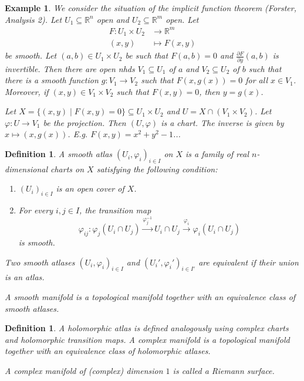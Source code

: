\documentclass[12pt]{article}
\theoremstyle{darkgreentheorem}
\theoremstyle{darkbluedefinition}
\newtheorem{defn}[thm]{Definition}
\theoremstyle{darkredexample}
\newtheorem{exa}[thm]{Example}
\theoremstyle{remark}
\newcommand{\R}{\mathbb{R}}
\newcommand{\1}{\mathbbm{1}}
\newcommand{\tms}{\times}
\begin{document}
\begin{exa}
    We consider the situation of the implicit function theorem (Forster, Analysis 2).
    Let $U_{1}\subseteq \R^{n}$ open and $U_{2}\subseteq \R^{m}$ open.
    Let
    \begin{align*}
	F\colon U_{1}\times U_{2} &\to \R^{m} \\
	(x,y) &\mapsto F(x,y)
    \end{align*}
    be smooth.
    Let $(a,b)\in U_{1}\times U_{2}$ be such that $F(a,b)=0$ and $\frac{\partial F}{\partial y}(a,b)$ is invertible.
    Then there are open nhds $V_{1}\subseteq U_{1}$ of $a$ and $V_{2}\subseteq U_{2}$ of $b$ such that there is a smooth function $g\colon V_{1}\to V_{2}$ such that $F(x,g(x))=0$ for all $x\in V_{1}$.
    Moreover, if $(x,y)\in V_{1}\times V_{2}$ such that $F(x,y)=0$, then $y=g(x)$.

    Let $X=\{(x,y)\mid F(x,y)=0\} \subseteq U_{1}\times U_{2}$ and $U=X\cap (V_{1}\tms V_{2})$.
    Let $\varphi \colon U\to V_{1}$ be the projection.
    Then $(U,\varphi)$ is a chart.
    The inverse is given by $x\mapsto (x,g(x))$.
    E.g. $F(x,y)=x^{2}+y^{2}-1$...
\end{exa}

\begin{defn}
    A \textit{smooth atlas} $(U_{i},\varphi_{i})_{i\in I}$ on $X$ is a family of real $n$-dimensional charts on $X$ satisfying the following condition:
    \begin{enumerate}[label=\arabic*)]
	\item $(U_{i})_{i\in I}$ is an open cover of $X$.
	\item For every $i,j\in I$, the transition map
	    \[\varphi_{ij}\colon \varphi_{j}(U_{i}\cap U_{j})\xrightarrow{\varphi_{j}^{-1}} U_{i}\cap U_{j}\xrightarrow{\varphi_{i}} \varphi_{i}(U_{i}\cap U_{j}) \]
	    is smooth.
    \end{enumerate}
    Two smooth atlases $(U_{i},\varphi_{i})_{i\in I}$ and $(U_{i}',\varphi_{i}')_{i\in I'}$ are equivalent if their union is an atlas.

    A \textit{smooth manifold} is a topological manifold together with an equivalence class of smooth atlases.
\end{defn}

\begin{defn}
    A \textit{holomorphic atlas} is defined analogously using complex charts and holomorphic transition maps.
    A \textit{complex manifold} is a topological manifold together with an equivalence class of holomorphic atlases.

    A complex manifold of (complex) dimension $1$ is called a \textit{Riemann surface}.
\end{defn}
\end{document}

